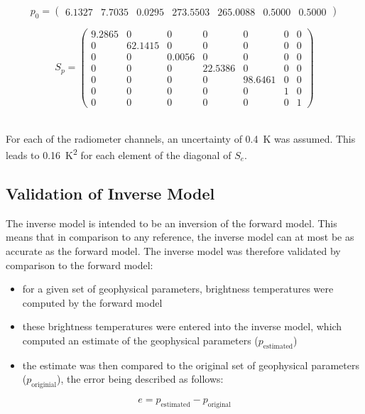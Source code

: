 \documentclass[11pt, a4paper]{article}
\begin{document}
\begin{equation*}
p_0 =
\begin{pmatrix}
   6.1327 & 7.7035 & 0.0295 & 273.5503 & 265.0088 & 0.5000 & 0.5000
\end{pmatrix}
\end{equation*}

\begin{equation*}
S_p =
\begin{pmatrix}
   9.2865 & 0 & 0 & 0 & 0 & 0 & 0 \\
   0 & 62.1415 & 0 & 0 & 0 & 0 & 0 \\
   0 & 0 & 0.0056 & 0 & 0 & 0 & 0 \\
   0 & 0 & 0 & 22.5386 & 0 & 0 & 0 \\
   0 & 0 & 0 & 0 & 98.6461 & 0 & 0 \\
   0 & 0 & 0 & 0 & 0 & 1 & 0 \\
   0 & 0 & 0 & 0 & 0 & 0 & 1
\end{pmatrix}
\end{equation*}

\ \\
For each of the radiometer channels, an uncertainty of \SI{0.4}{K} was assumed. This leads to \SI{0.16}{K^2} for each element of the diagonal of \(S_e\).


\subsection{Validation of Inverse Model}

The inverse model is intended to be an inversion of the forward model. This means that in comparison to any reference, the inverse model can at most be as accurate as the forward model. The inverse model was therefore validated by comparison to the forward model: 
\begin{itemize}
\item for a given set of geophysical parameters, brightness temperatures were computed by the forward model
\item these brightness temperatures were entered into the inverse model, which computed an estimate of the geophysical parameters (\(p_\text{estimated}\))
\item the estimate was then compared to the original set of geophysical parameters (\(p_\text{originial}\)), the error being described as follows:
\end{itemize}
\begin{equation*}
e = p_\text{estimated} - p_\text{original}
\end{equation*}
\end{document}
